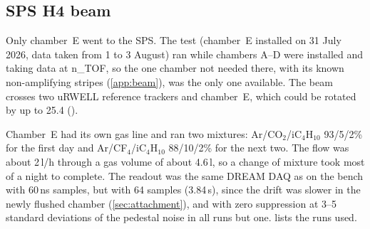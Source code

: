 \subsection{SPS H4 beam}
Only chamber~E went to the SPS. The test (chamber~E installed on 31 July 2026, data taken from 1 to 3 August) ran while
chambers A--D were installed and taking data at n\_TOF, so the one chamber not needed there, with its known non-amplifying stripes
(\cref{app:beam}), was the only one available. The beam crosses two uRWELL reference trackers and chamber~E, which could be
rotated by up to 25.4\textdegree{} ().

Chamber~E had its own gas line and ran two mixtures: Ar/CO$_2$/iC$_4$H$_{10}$ 93/5/2\% for the first day and Ar/CF$_4$/iC$_4$H$_{10}$ 88/10/2\% for the next two. The flow was about 2\,l/h through a gas volume of about 4.6\,l, so a
change of mixture took most of a night to complete. 
The readout was the same DREAM DAQ as on the bench with 60\,ns samples, but with 64 samples (3.84\,\textmu s), since the drift was slower in the newly flushed chamber (\cref{sec:attachment}), and with zero suppression at 3--5 standard deviations of the pedestal noise in all runs but one.  lists the runs used.
